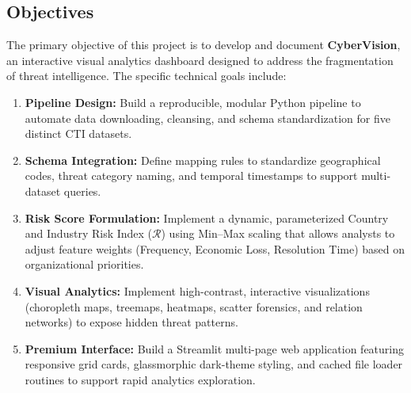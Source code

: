 \documentclass[a4paper, 12pt]{report}
\begin{document}
\subsection{Objectives}
The primary objective of this project is to develop and document \textbf{CyberVision}, an interactive visual analytics dashboard designed to address the fragmentation of threat intelligence. The specific technical goals include:
\begin{enumerate}
    \item \textbf{Pipeline Design:} Build a reproducible, modular Python pipeline to automate data downloading, cleansing, and schema standardization for five distinct CTI datasets.
    \item \textbf{Schema Integration:} Define mapping rules to standardize geographical codes, threat category naming, and temporal timestamps to support multi-dataset queries.
    \item \textbf{Risk Score Formulation:} Implement a dynamic, parameterized Country and Industry Risk Index ($\mathcal{R}$) using Min--Max scaling that allows analysts to adjust feature weights (Frequency, Economic Loss, Resolution Time) based on organizational priorities.
    \item \textbf{Visual Analytics:} Implement high-contrast, interactive visualizations (choropleth maps, treemaps, heatmaps, scatter forensics, and relation networks) to expose hidden threat patterns.
    \item \textbf{Premium Interface:} Build a Streamlit multi-page web application featuring responsive grid cards, glassmorphic dark-theme styling, and cached file loader routines to support rapid analytics exploration.
\end{enumerate}
\end{document}
